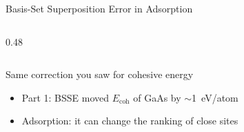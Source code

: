 \documentclass[8pt]{beamer}
\begin{document}
\begin{frame}{Basis-Set Superposition Error in Adsorption}
\begin{columns}[T]
\begin{column}{0.48\textwidth}
{%
			}
		\end{column}
	\end{columns}
	\vspace{0.0cm}
	\begin{alertblock}{Same correction you saw for cohesive energy}
		\small
		\begin{itemize}
			\item Part 1: BSSE moved $E_{\text{coh}}$ of GaAs by $\sim$1~eV/atom
			\item Adsorption: it can change the ranking of close sites
		\end{itemize}
	\end{alertblock}
\end{frame}
\end{document}
